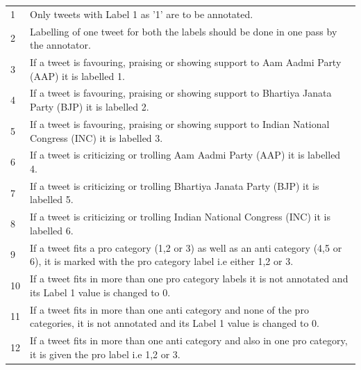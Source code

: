 \documentclass[a0,portrait]{a0poster}
\begin{document}
\begin{multicols}{2}
\begin{center}\vspace{1cm}
\begin{tabular}{l p{35cm} }
\toprule
1 & Only tweets with Label 1 as '1' are to be annotated.\\
2 & Labelling of one tweet for both the labels should be done in one pass by the annotator.\\
3 & If a tweet is favouring, praising or showing support to Aam Aadmi Party (AAP) it is labelled 1.\\
4 & If a tweet is favouring, praising or showing support to Bhartiya Janata Party (BJP) it is labelled 2.\\
5 & If a tweet is favouring, praising or showing support to Indian National Congress (INC) it is labelled 3.\\
6 & If a tweet is criticizing or trolling Aam Aadmi Party (AAP) it is labelled 4.\\
7 & If a tweet is criticizing or trolling Bhartiya Janata Party (BJP) it is labelled 5.\\
8 & If a tweet is criticizing or trolling Indian National Congress (INC) it is labelled 6.\\
9 & If a tweet fits a pro category (1,2 or 3) as well as an anti category (4,5 or 6), it is marked with the pro category label i.e either 1,2 or 3.\\ 
10 & If a tweet fits in more than one pro category labels it is not annotated and its Label 1 value is changed to 0.\\
11 & If a tweet fits in more than one anti category and none of the pro categories, it is not annotated and its Label 1 value is changed to 0.\\
12 & If a tweet fits in more than one anti category and also in one pro category, it is given the pro label i.e 1,2 or 3.\\
\bottomrule
\end{tabular}
\end{center}


\end{multicols}
\end{document}
